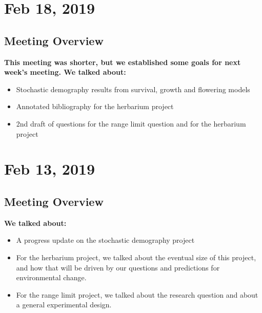 \documentclass{article}
\begin{document}
\section*{Feb 18, 2019}
\subsection*{Meeting Overview}
\textbf{This meeting was shorter, but we established some goals for next week's meeting. We talked about:}
\begin{itemize}
\item{Stochastic demography results from survival, growth and flowering models}
\item{Annotated bibliography for the herbarium project}
\item{2nd draft of questions for the range limit question and for the herbarium project}
\end{itemize}

\section*{Feb 13, 2019}
\subsection*{Meeting Overview}
\textbf{We talked about:}
\begin{itemize}
\item{A progress update on the stochastic demography project}
\item{For the herbarium project, we talked about the eventual size of this project, and how that will be driven by our questions and predictions for environmental change.}
\item{For the range limit project, we talked about the research question and about a general experimental design.}
\end{itemize}
\end{document}
